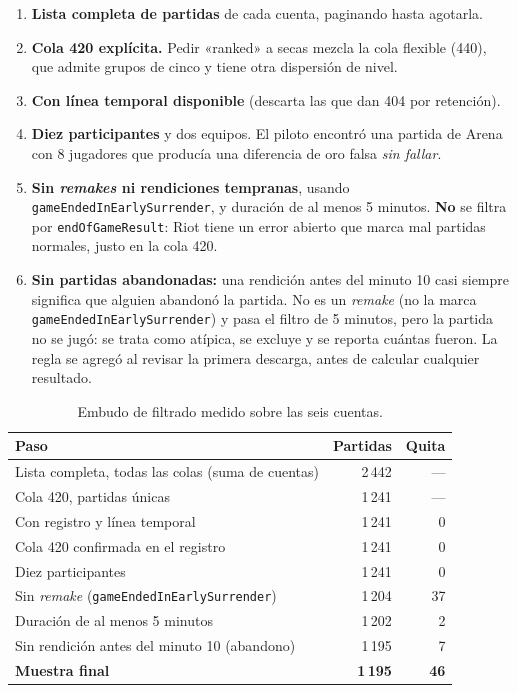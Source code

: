 \documentclass[11pt,letterpaper]{article}
\begin{document}
\begin{enumerate}[leftmargin=1.6em,itemsep=.3em]
  \item \textbf{Lista completa de partidas} de cada cuenta, paginando hasta agotarla.
  \item \textbf{Cola 420 explícita.} Pedir «ranked» a secas mezcla la cola flexible
        (440), que admite grupos de cinco y tiene otra dispersión de nivel.
  \item \textbf{Con línea temporal disponible} (descarta las que dan 404 por
        retención).
  \item \textbf{Diez participantes} y dos equipos. El piloto encontró una partida de
        Arena con 8 jugadores que producía una diferencia de oro falsa \emph{sin
        fallar}.
  \item \textbf{Sin \emph{remakes} ni rendiciones tempranas}, usando
        \texttt{gameEndedInEarlySurrender}, y duración de al menos 5 minutos.
        \textbf{No} se filtra por \texttt{endOfGameResult}: Riot tiene un error
        abierto que marca mal partidas normales, justo en la cola 420.
  \item \textbf{Sin partidas abandonadas:} una rendición antes del minuto 10 casi
        siempre significa que alguien abandonó la partida. No es un \emph{remake} (no
        la marca \texttt{gameEndedInEarlySurrender}) y pasa el filtro de 5 minutos,
        pero la partida no se jugó: se trata como atípica, se excluye y se reporta
        cuántas fueron. La regla se agregó al revisar la primera descarga, antes de
        calcular cualquier resultado.
\end{enumerate}

\begin{table}[H]\centering\small
\caption{Embudo de filtrado medido sobre las seis cuentas.}
\label{tab:embudo}
\begin{tabular}{lrr}
\toprule
Paso & Partidas & Quita \\
\midrule
Lista completa, todas las colas (suma de cuentas) & 2\,442 & — \\
Cola 420, partidas únicas & 1\,241 & — \\
Con registro y línea temporal & 1\,241 & 0 \\
Cola 420 confirmada en el registro & 1\,241 & 0 \\
Diez participantes & 1\,241 & 0 \\
Sin \emph{remake} (\texttt{gameEndedInEarlySurrender}) & 1\,204 & 37 \\
Duración de al menos 5 minutos & 1\,202 & 2 \\
Sin rendición antes del minuto 10 (abandono) & 1\,195 & 7 \\
\midrule
\textbf{Muestra final} & \textbf{1\,195} & \textbf{46} \\
\bottomrule
\end{tabular}
\end{table}
\end{document}
